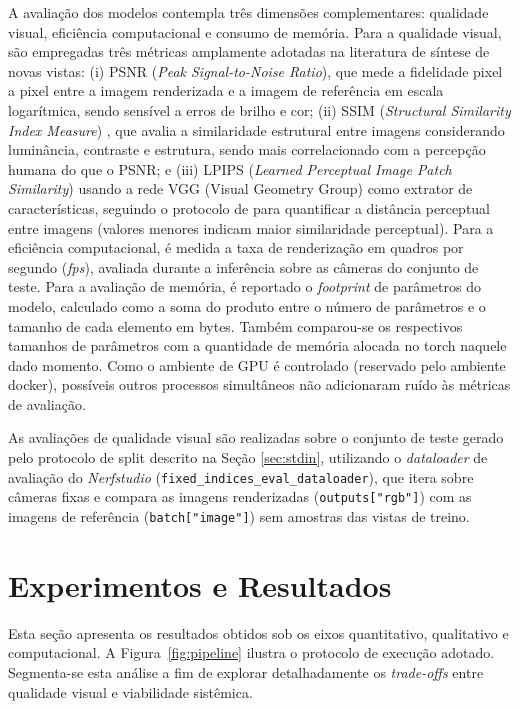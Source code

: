 \documentclass[12pt]{article}
\begin{document}
A avaliação dos modelos contempla três dimensões complementares: qualidade visual, eficiência computacional e consumo de memória. Para a qualidade visual, são empregadas três métricas amplamente adotadas na literatura de síntese de novas vistas: (i) PSNR (\textit{Peak Signal-to-Noise Ratio}), que mede a fidelidade pixel a pixel entre a imagem renderizada e a imagem de referência em escala logarítmica, sendo sensível a erros de brilho e cor; (ii) SSIM (\textit{Structural Similarity Index Measure}) \cite{wang2004image}, que avalia a similaridade estrutural entre imagens considerando luminância, contraste e estrutura, sendo mais correlacionado com a percepção humana do que o PSNR; e (iii) LPIPS (\textit{Learned Perceptual Image Patch Similarity}) \cite{zhang2018unreasonable} usando a rede VGG (Visual Geometry Group) como extrator de características, seguindo o protocolo de \cite{niemeyer2022regnerf} para quantificar a distância perceptual entre imagens (valores menores indicam maior similaridade perceptual). Para a eficiência computacional, é medida a taxa de renderização em quadros por segundo (\textit{fps}), avaliada durante a inferência sobre as câmeras do conjunto de teste. Para a avaliação de memória, é reportado o \textit{footprint} de parâmetros do modelo, calculado como a soma do produto entre o número de parâmetros e o tamanho de cada elemento em bytes. Também comparou-se os respectivos tamanhos de parâmetros com a quantidade de memória alocada no torch naquele dado momento. Como o ambiente de GPU é controlado (reservado pelo ambiente docker), possíveis outros processos simultâneos não adicionaram ruído às métricas de avaliação.


As avaliações de qualidade visual são realizadas sobre o conjunto de teste gerado pelo protocolo de split descrito na Seção \ref{sec:stdin}, utilizando o \textit{dataloader} de avaliação do \textit{Nerfstudio} (\texttt{fixed\_indices\_eval\_dataloader}), que itera sobre câmeras fixas e compara as imagens renderizadas (\texttt{outputs["rgb"]}) com as imagens de referência (\texttt{batch["image"]}) sem amostras das vistas de treino.

\section{Experimentos e Resultados}

Esta seção apresenta os resultados obtidos sob os eixos quantitativo, qualitativo e computacional. A Figura~\ref{fig:pipeline} ilustra o protocolo de execução adotado. Segmenta-se esta análise a fim de explorar detalhadamente os \textit{trade-offs} entre qualidade visual e viabilidade sistêmica.
\end{document}
